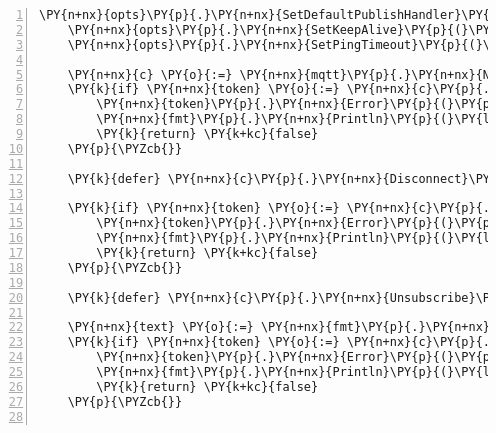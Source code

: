 \begin{Verbatim}[commandchars=\\\{\},numbers=left,firstnumber=1,stepnumber=1,frame=single]
	\PY{n+nx}{opts}\PY{p}{.}\PY{n+nx}{SetDefaultPublishHandler}\PY{p}{(}\PY{n+nx}{f}\PY{p}{)}
	\PY{n+nx}{opts}\PY{p}{.}\PY{n+nx}{SetKeepAlive}\PY{p}{(}\PY{n+nx}{timeout}\PY{p}{)}
	\PY{n+nx}{opts}\PY{p}{.}\PY{n+nx}{SetPingTimeout}\PY{p}{(}\PY{n+nx}{timeout}\PY{p}{)}

	\PY{n+nx}{c} \PY{o}{:=} \PY{n+nx}{mqtt}\PY{p}{.}\PY{n+nx}{NewClient}\PY{p}{(}\PY{n+nx}{opts}\PY{p}{)}
	\PY{k}{if} \PY{n+nx}{token} \PY{o}{:=} \PY{n+nx}{c}\PY{p}{.}\PY{n+nx}{Connect}\PY{p}{(}\PY{p}{)}\PY{p}{;} \PY{n+nx}{token}\PY{p}{.}\PY{n+nx}{WaitTimeout}\PY{p}{(}\PY{n+nx}{remainingTime}\PY{p}{(}\PY{p}{)}\PY{p}{)} \PY{o}{\PYZam{}\PYZam{}}
		\PY{n+nx}{token}\PY{p}{.}\PY{n+nx}{Error}\PY{p}{(}\PY{p}{)} \PY{o}{!=} \PY{k+kc}{nil} \PY{p}{\PYZob{}}
		\PY{n+nx}{fmt}\PY{p}{.}\PY{n+nx}{Println}\PY{p}{(}\PY{l+s}{\PYZdq{}Error connect:\PYZdq{}}\PY{p}{,} \PY{n+nx}{token}\PY{p}{.}\PY{n+nx}{Error}\PY{p}{(}\PY{p}{)}\PY{p}{)}
		\PY{k}{return} \PY{k+kc}{false}
	\PY{p}{\PYZcb{}}

	\PY{k}{defer} \PY{n+nx}{c}\PY{p}{.}\PY{n+nx}{Disconnect}\PY{p}{(}\PY{l+m+mi}{0}\PY{p}{)}

	\PY{k}{if} \PY{n+nx}{token} \PY{o}{:=} \PY{n+nx}{c}\PY{p}{.}\PY{n+nx}{Subscribe}\PY{p}{(}\PY{n+nx}{topic}\PY{p}{,} \PY{l+m+mi}{2}\PY{p}{,} \PY{k+kc}{nil}\PY{p}{)}\PY{p}{;} \PY{n+nx}{token}\PY{p}{.}\PY{n+nx}{WaitTimeout}\PY{p}{(}\PY{n+nx}{remainingTime}\PY{p}{(}\PY{p}{)}\PY{p}{)} \PY{o}{\PYZam{}\PYZam{}}
		\PY{n+nx}{token}\PY{p}{.}\PY{n+nx}{Error}\PY{p}{(}\PY{p}{)} \PY{o}{!=} \PY{k+kc}{nil} \PY{p}{\PYZob{}}
		\PY{n+nx}{fmt}\PY{p}{.}\PY{n+nx}{Println}\PY{p}{(}\PY{l+s}{\PYZdq{}Error subscribe:\PYZdq{}}\PY{p}{,} \PY{n+nx}{token}\PY{p}{.}\PY{n+nx}{Error}\PY{p}{(}\PY{p}{)}\PY{p}{)}
		\PY{k}{return} \PY{k+kc}{false}
	\PY{p}{\PYZcb{}}

	\PY{k}{defer} \PY{n+nx}{c}\PY{p}{.}\PY{n+nx}{Unsubscribe}\PY{p}{(}\PY{n+nx}{topic}\PY{p}{)}

	\PY{n+nx}{text} \PY{o}{:=} \PY{n+nx}{fmt}\PY{p}{.}\PY{n+nx}{Sprintf}\PY{p}{(}\PY{l+s}{\PYZdq{}hello from control plane\PYZdq{}}\PY{p}{)}
	\PY{k}{if} \PY{n+nx}{token} \PY{o}{:=} \PY{n+nx}{c}\PY{p}{.}\PY{n+nx}{Publish}\PY{p}{(}\PY{n+nx}{topic}\PY{p}{,} \PY{l+m+mi}{2}\PY{p}{,} \PY{k+kc}{false}\PY{p}{,} \PY{n+nx}{text}\PY{p}{)}\PY{p}{;} \PY{n+nx}{token}\PY{p}{.}\PY{n+nx}{WaitTimeout}\PY{p}{(}\PY{n+nx}{remainingTime}\PY{p}{(}\PY{p}{)}\PY{p}{)} \PY{o}{\PYZam{}\PYZam{}}
		\PY{n+nx}{token}\PY{p}{.}\PY{n+nx}{Error}\PY{p}{(}\PY{p}{)} \PY{o}{!=} \PY{k+kc}{nil} \PY{p}{\PYZob{}}
		\PY{n+nx}{fmt}\PY{p}{.}\PY{n+nx}{Println}\PY{p}{(}\PY{l+s}{\PYZdq{}Error publish:\PYZdq{}}\PY{p}{,} \PY{n+nx}{token}\PY{p}{.}\PY{n+nx}{Error}\PY{p}{(}\PY{p}{)}\PY{p}{)}
		\PY{k}{return} \PY{k+kc}{false}
	\PY{p}{\PYZcb{}}


\end{Verbatim}

